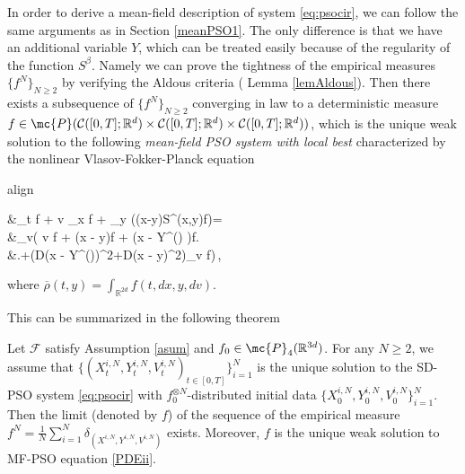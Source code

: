 \documentclass{ims9x6}
\newcommand{\coloredeq}[2]{\begin{empheq}[box={\mymath[colback=gray!13, sharp corners]}]{align}\label{#1}#2\end{empheq}}
\renewcommand{\bar}{\overline}
\newcommand{\CR}{\mathcal{C}([0,T];\mathbb{R}^d)}
\newcommand{\TE}{\mathcal{F}}
\newcommand{\RR}{\mathbb{R}}
\begin{document}
In order to derive a mean-field description of system \eqref{eq:psocir}, we can follow the same arguments as in Section \ref{meanPSO1}. The only difference is that we have an additional variable $Y$, which can be treated easily because of the regularity of the function $S^\beta$.
 Namely we can prove the tightness of the empirical measures $\{f^N\}_{N\geq2}$ by verifying the Aldous criteria ( Lemma \ref{lemAldous}). Then there exists a subsequence of $\{f^N\}_{N\geq 2}$ converging in law to a deterministic measure $f\in\mc{P}(\CR\times\CR\times\CR)$, which is the unique weak solution to the following \emph{mean-field PSO system with local best} characterized by the nonlinear Vlasov-Fokker-Planck equation
 \coloredeq{PDEii}{
\begin{split}
&\partial_t f + v \cdot \nabla_x f + \nabla_y \cdot \left(\nu(x-y)S^\beta(x,y)f\right)= 
\\
&\qquad \nabla_v\cdot\left(\frac{\gamma}{\iw} v f + \frac{\lambda_1}{\iw} (x - y)f
+ \frac{\lambda_2}{\iw} (x - Y^\alpha(\bar\rho) )f\right.\\
&\qquad \left.+\left(\frac{\sigma_2^2}{2{\iw^2}}D(x - Y^\alpha(\bar\rho))^2+\frac{\sigma_1^2}{2{\iw}^2}D(x - y)^2\right)\nabla_v f\right)\,,
\end{split}}
where $\bar\rho(t,y)=\int_{ \RR^{2d}}f(t,dx,y,dv)$.

This can be summarized in the following theorem
\begin{theo-frmd}
	Let $\TE$ satisfy Assumption \ref{asum} and $f_0\in \mc{P}_4(\RR^{3d})$. For any $N\geq 2$, we assume that $\{(X_t^{i,N},Y_t^{i,N},V_t^{i,N})_{t\in[0,T]}\}_{i=1}^N$ is the unique solution to the SD-PSO system \eqref{eq:psocir} with $f_0^{\otimes N}$-distributed initial data $\{X_0^{i,N},Y_0^{i,N},V_0^{i,N}\}_{i=1}^N$.  Then the limit (denoted by $f$) of the sequence of the empirical measure $f^N=\frac{1}{N}\sum_{i=1}^N\delta_{(X^{i,N},Y^{i,N},V^{i,N})}$ exists. Moreover, $f$ is the unique weak solution to MF-PSO equation \eqref{PDEii}.
\end{theo-frmd}
\end{document}
